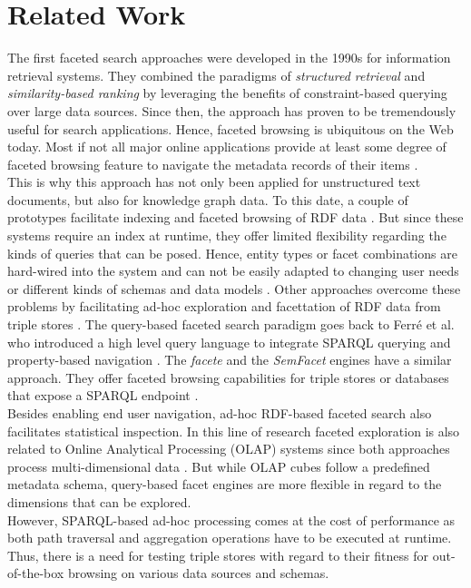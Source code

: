 \section{Related Work}
\label{sec:related-work}
The first faceted search approaches were developed in the 1990s for information retrieval systems. They combined the paradigms of \textit{structured retrieval} and \textit{similarity-based ranking} by leveraging the benefits of constraint-based querying over large data sources. Since then, the approach has proven to be tremendously useful for search applications. Hence, faceted browsing is ubiquitous on the Web today. Most if not all major online applications provide at least some degree of faceted browsing feature to navigate the metadata records of their items \cite{tunkelang}.\\
This is why this approach has not only been applied for unstructured text documents, but also for knowledge graph data. To this date, a couple of prototypes facilitate indexing and faceted browsing of RDF data \cite{cheng, davies, hahn, waitelonis, moreno-vega}. But since these systems require an index at runtime, they offer limited flexibility regarding the kinds of queries that can be posed. Hence, entity types or facet combinations are hard-wired into the system and can not be easily adapted to changing user needs or different kinds of schemas and data models \cite{wenige}. Other approaches overcome these problems by facilitating ad-hoc exploration and facettation of RDF data from triple stores \cite{stadler, kremen, ferre, arenas}. The query-based faceted search paradigm goes back to Ferr\'{e} et al. who introduced a high level query language to integrate SPARQL querying and property-based navigation \cite{ferre}. The \textit{facete} and the \textit{SemFacet} engines \cite{arenas} have a similar approach. They offer faceted browsing capabilities for triple stores or databases that expose a SPARQL endpoint \cite{stadler}.\\
Besides enabling end user navigation, ad-hoc RDF-based faceted search also facilitates statistical inspection. In this line of research faceted exploration is also related to Online Analytical Processing (OLAP) systems since both approaches process multi-dimensional data \cite{ben-yitzhak}. But while OLAP cubes follow a predefined metadata schema, query-based facet engines are more flexible in regard to the dimensions that can be explored.\\
However, SPARQL-based ad-hoc processing comes at the cost of performance as both path traversal and aggregation operations have to be executed at runtime. Thus, there is a need for testing triple stores with regard to their fitness for out-of-the-box browsing on various data sources and schemas.
